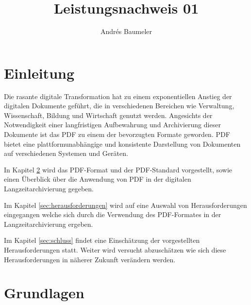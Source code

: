 \documentclass[a4paper,oneside, 12pt]{report}
\title{Leistungsnachweis 01}
\author{Andrés Baumeler}
\begin{document}

\pagestyle{empty} %





\cleardoublepage
\tableofcontents %
\cleardoublepage %

\pagestyle{plain} %



\chapter{Einleitung}\label{sec:motivation}
Die rasante digitale Transformation hat zu einem exponentiellen Anstieg der digitalen Dokumente geführt, die in verschiedenen Bereichen wie Verwaltung, Wissenschaft, Bildung und Wirtschaft genutzt werden. Angesichts der Notwendigkeit einer langfristigen Aufbewahrung und Archivierung dieser Dokumente ist das \ac{PDF} zu einem der bevorzugten Formate geworden. \ac{PDF} bietet eine plattformunabhängige und konsistente Darstellung von Dokumenten auf verschiedenen Systemen und Geräten.

In Kapitel \ref{sec:grundlagen} wird das \ac{PDF}-Format und der \ac{PDF}-Standard vorgestellt, sowie einen Überblick über die Anwendung von \ac{PDF} in der digitalen Langzeitarchivierung gegeben. 

Im Kapitel \ref{sec:herausforderungen} wird auf eine Auswahl von Herausforderungen eingegangen welche sich durch die Verwendung des \ac{PDF}-Formates in der Langzeitarchivierung ergeben.

Im Kapitel \ref{sec:schluss} findet eine Einschätzung der vorgestellten Herausforderungen statt. Weiter wird versucht abzuschätzen wie sich diese Herausforderungen in näherer Zukunft verändern werden.




\chapter{Grundlagen}\label{sec:grundlagen}
\end{document}
